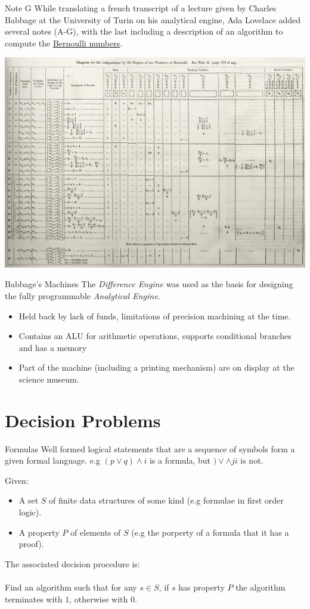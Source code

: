 \begin{sidenotebox}{Note G}
    While translating a french transcript of a lecture given by Charles Babbage at the University of Turin on his analytical engine, Ada Lovelace added several notes (A-G), with the last including a description of an algorithm to compute the \href{https://en.wikipedia.org/wiki/Bernoulli_number}{Bernoulli numbers}.
    \begin{center}
        \includegraphics[width=.8\textwidth]{introduction/images/note_G.jpg}
    \end{center}
\end{sidenotebox}

\begin{sidenotebox}{Babbage's Machines}
    The \textit{Difference Engine} was used as the basis for designing the fully programmable \textit{Analytical Engine}.
    \begin{itemize}
        \item Held back by lack of funds, limitations of precision machining at the time.
        \item Contains an ALU for arithmetic operations, supports conditional branches and has a memory
        \item Part of the machine (including a printing mechanism) are on display at the science museum.
    \end{itemize}
\end{sidenotebox}

\section{Decision Problems}
\begin{definitionbox}{Formulas}
    Well formed logical statements that are a sequence of symbols form a given formal language. e.g $(p \lor q) \land i$ is a formula, but $) \lor \land j i$ is not.
\end{definitionbox}
Given:
\begin{itemize}
	\item A set $S$ of finite data structures of some kind (e.g formulae in first order logic).
	\item A property $P$ of elements of $S$ (e.g the porperty of a formula that it has a proof).
\end{itemize}
The associated decision procedure is:
\\
\\ Find an algorithm such that for any $s \in S$, if $s$ has property $P$ the algorithm terminates with $1$, otherwise with $0$.


